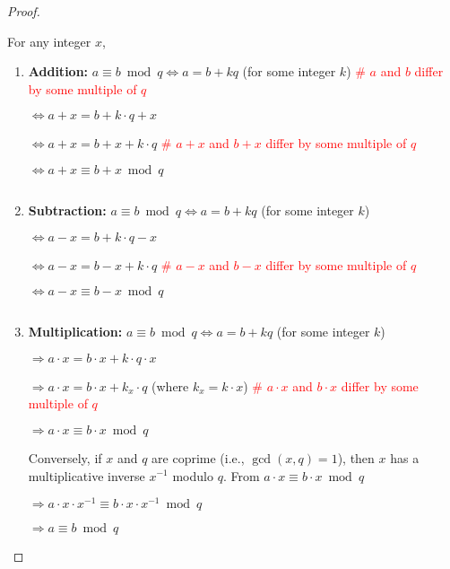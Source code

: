 \begin{proof}

$ $

For any integer $x$,

\begin{enumerate}


\item \textbf{Addition:} $a \equiv b \bmod q \Longleftrightarrow a = b + k q $ (for some integer $k$) \textcolor{red}{ \text{ } \# $a$ and $b$ differ by some multiple of $q$}

$\Longleftrightarrow a + x = b + k\cdot q + x$

$\Longleftrightarrow a + x = b + x + k\cdot q$ \textcolor{red}{ \text{ }  \# $a+x$ and $b+x$ differ by some multiple of $q$}

$\Longleftrightarrow a + x \equiv b + x \bmod q$

$ $

\item \textbf{Subtraction:} $a \equiv b \bmod q \Longleftrightarrow a = b + k q $ (for some integer $k$)

$\Longleftrightarrow a - x = b + k\cdot q - x$

$\Longleftrightarrow a - x = b - x + k\cdot q$  \textcolor{red}{ \text{ }  \# $a-x$ and $b-x$ differ by some multiple of $q$}

$\Longleftrightarrow a - x \equiv b - x \bmod q$

$ $

\item \textbf{Multiplication:} $a \equiv b \bmod q \Longleftrightarrow a = b + k q $ (for some integer $k$)

$\Longrightarrow a \cdot x = b \cdot x + k\cdot q \cdot x$

$\Longrightarrow a \cdot x = b \cdot x + k_x\cdot q$ (where $k_x = k \cdot x$)  \textcolor{red}{ \text{ }  \# $a\cdot x$ and $b\cdot x$ differ by some multiple of $q$}

$\Longrightarrow a \cdot x \equiv b \cdot x \bmod q$

Conversely, if $x$ and $q$ are coprime (i.e., $\gcd(x,q)=1$), then $x$ has a multiplicative inverse $x^{-1}$ modulo $q$. From $a \cdot x \equiv b \cdot x \bmod q$

$\Longrightarrow a \cdot x \cdot x^{-1} \equiv b \cdot x \cdot x^{-1} \bmod q$

$\Longrightarrow a \equiv b \bmod q$

\end{enumerate}
\end{proof}

